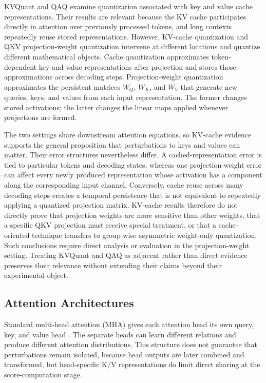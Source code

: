 KVQuant \cite{kvquant2024} and QAQ \cite{qaq2024} examine quantization associated with key and value cache representations. Their results are relevant because the KV cache participates directly in attention over previously processed tokens, and long contexts repeatedly reuse stored representations. However, KV-cache quantization and QKV projection-weight quantization intervene at different locations and quantize different mathematical objects. Cache quantization approximates token-dependent key and value representations after projection and stores those approximations across decoding steps. Projection-weight quantization approximates the persistent matrices $W_Q$, $W_K$, and $W_V$ that generate new queries, keys, and values from each input representation. The former changes stored activations; the latter changes the linear maps applied whenever projections are formed.

The two settings share downstream attention equations, so KV-cache evidence supports the general proposition that perturbations to keys and values can matter. Their error structures nevertheless differ. A cached-representation error is tied to particular tokens and decoding states, whereas one projection-weight error can affect every newly produced representation whose activation has a component along the corresponding input channel. Conversely, cache reuse across many decoding steps creates a temporal persistence that is not equivalent to repeatedly applying a quantized projection matrix. KV-cache results therefore do not directly prove that projection weights are more sensitive than other weights, that a specific QKV projection must receive special treatment, or that a cache-oriented technique transfers to group-wise asymmetric weight-only quantization. Such conclusions require direct analysis or evaluation in the projection-weight setting. Treating KVQuant and QAQ as adjacent rather than direct evidence preserves their relevance without extending their claims beyond their experimental object.

\subsection{Attention Architectures}

Standard multi-head attention (MHA) gives each attention head its own query, key, and value head \cite{vaswani2017attention}. The separate heads can learn different relations and produce different attention distributions. This structure does not guarantee that perturbations remain isolated, because head outputs are later combined and transformed, but head-specific K/V representations do limit direct sharing at the score-computation stage.

